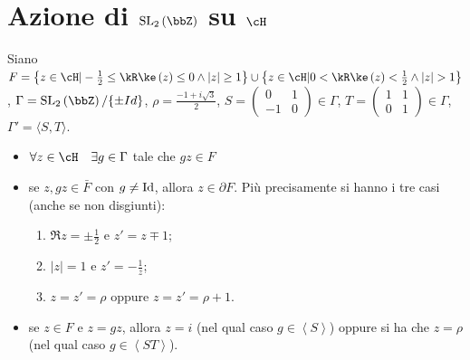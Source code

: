 
\section{Azione di $\SL_2 \left( \bbZ \right)$ su $\cH$}

Siano $F=\left\{z \in \cH | -\frac{1}{2} \leq \Re(z) \leq 0
\wedge |z| \geq 1 \right\} \cup
\left\{z \in \cH | 0 < \Re(z) < \frac{1}{2} \wedge |z| > 1 \right\}$,
$\Gamma = \SL_2 \left( \bbZ \right)/\{\pm Id\}$,   $\rho=\frac{-1+i\sqrt{3}}{2}$,
$S=\left( \begin{array}{cc} 0 & 1 \\ -1 & 0 \end{array} \right) \in \Gamma$,
$T=\left( \begin{array}{cc} 1 & 1 \\ 0 & 1 \end{array} \right) \in \Gamma$,
$\Gamma' = \langle S, T \rangle$.

\begin{teorema}
\begin{itemize}
\item[P0] $\forall z \in \cH \quad \exists g \in \Gamma$ tale che $gz \in F$
\item[P1] se $z,gz \in \bar{F}$ con $g \neq \text{Id}$, allora $z \in \partial F$.
  Più precisamente si hanno i tre casi (anche se non disgiunti):
  \begin{enumerate}
  \item[C1] $\Re z = \pm \frac{1}{2}$ e $z' = z \mp 1$;
  \item[C2] $|z| = 1$ e $z' = - \frac{1}{z}$;
  \item[C3] $z = z' = \rho$ oppure $z = z' = \rho + 1$.
  \end{enumerate}
\item[P2] se $z \in F$ e $z=gz$,
  allora $z=i$ (nel qual caso $g \in \left\langle S \right\rangle$) oppure si ha che
  $z= \rho$ (nel qual caso $g \in \left\langle ST \right\rangle$).
\end{itemize}
\end{teorema}

